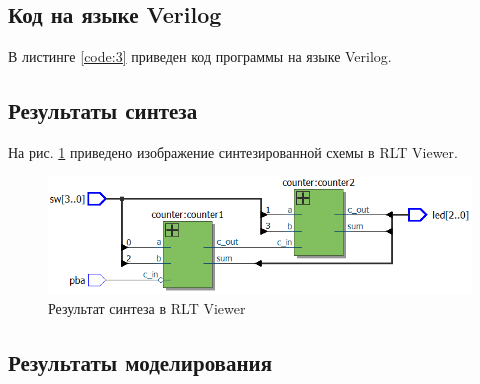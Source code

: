 \subsection{Код на языке Verilog}

В листинге \ref{code:3} приведен код программы на языке Verilog.



\subsection{Результаты синтеза}

На рис. \ref{fig:elab1_3_rtl} приведено изображение синтезированной схемы в RLT Viewer.

\begin{figure}[H]
\begin{center}
	\includegraphics[scale=0.8]{elab1_3_rtl}
	\caption{Результат синтеза в RLT Viewer}
	\label{fig:elab1_3_rtl}
\end{center}
\end{figure}

\subsection{Результаты моделирования}
\label{sec:elab1_3_modeling}

